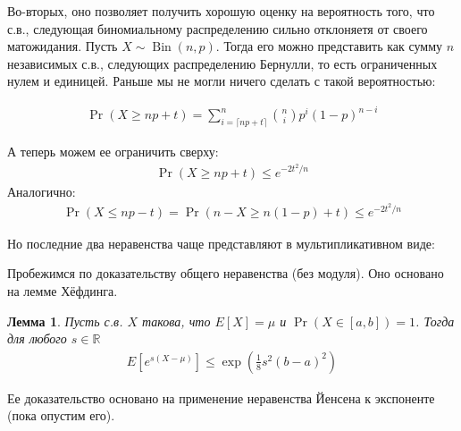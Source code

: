 \documentclass[12pt]{article}
\newcommand\R{\mathbb{R}}
\DeclareMathOperator{\Bin}{Bin}
\newtheorem{lemma}{Лемма}
\begin{document}
Во-вторых, оно позволяет получить хорошую оценку на вероятность того, что с.в., следующая биномиальному распределению сильно отклоняетя от своего матожидания. Пусть $X \sim \Bin(n, p)$. Тогда его можно представить как сумму $n$ независимых с.в., следующих распределению Бернулли, то есть ограниченных нулем и единицей. Раньше мы не могли ничего сделать с такой вероятностью:

\begin{align*}
  \Pr(X \ge np + t) = \sum_{i = \lceil np + t\rceil}^n \binom{n}{i} p^i (1 - p)^{n - i}
\end{align*}

А теперь можем ее ограничить сверху:
\begin{align*}
  \Pr(X \ge np + t) \le e^{-2t^2/n}
\end{align*}
Аналогично:
\begin{align*}
  \Pr(X \le np - t) = \Pr(n - X \ge n(1 - p) + t) \le e^{-2t^2/n}
\end{align*}

Но последние два неравенства чаще представляют в мультипликативном виде:
\begin{center}
\end{center}

Пробежимся по доказательству общего неравенства (без модуля). Оно основано на лемме Хёфдинга.

 \begin{lemma}
   Пусть с.в. $X$ такова, что $E[X] = \mu$ и $\Pr(X \in [a,b]) = 1$. Тогда для любого $s \in \R$
   \begin{align*}
     E[e^{s(X - \mu)}] \le \exp\left(\frac{1}{8}s^2(b - a)^2 \right)
   \end{align*} 
 \end{lemma}

Ее доказательство основано на применение неравенства Йенсена к экспоненте (пока опустим его).
\end{document}

